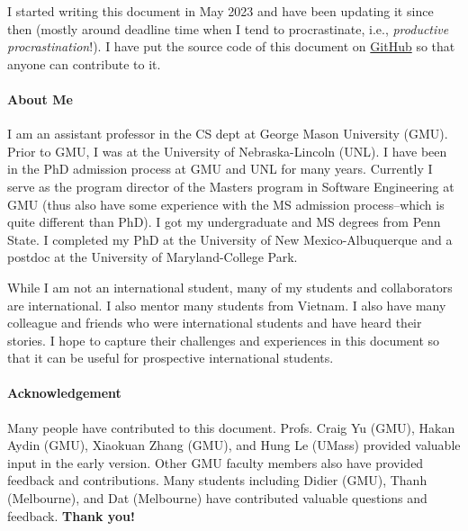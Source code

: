 \documentclass[oneside,11pt]{memoir}
\begin{document}
I started writing this document in May 2023 and have been updating it since then (mostly around deadline time when I tend to procrastinate, i.e., \emph{productive procrastination}!). I have put the source code of this document on \href{https://github.com/nguyenthanhvuh/phd-cs-us}{GitHub} so that anyone can contribute to it.  

\paragraph{About Me} I am an assistant professor in the CS dept at George Mason University (GMU). Prior to GMU, I was at the University of Nebraska-Lincoln (UNL). I have been in the PhD admission process at GMU and UNL for many years.  Currently I serve as the program director of the Masters program in Software Engineering at GMU (thus also have some experience with the MS admission process--which is quite different than PhD). I got my undergraduate and MS degrees from Penn State. I completed my PhD at the University of New Mexico-Albuquerque and a postdoc at the University of Maryland-College Park.

While I am not an international student, many of my students and collaborators are international.  I also mentor many students from Vietnam.  I also have many colleague and friends who were international students and have heard their stories.  I hope to capture their challenges and experiences in this document so that it can be useful for prospective international students.

\paragraph{Acknowledgement} Many people have contributed to this document.
Profs. Craig Yu (GMU), Hakan Aydin (GMU), 
Xiaokuan Zhang (GMU), and Hung Le (UMass) provided valuable input in the early version. Other GMU faculty members also have provided feedback and contributions.  Many students including Didier (GMU), Thanh (Melbourne), and Dat (Melbourne) have contributed valuable questions and feedback. 
\textbf{Thank you!}





\end{document}
